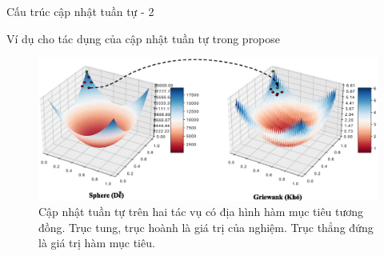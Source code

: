 \begin{frame}{Cấu trúc cập nhật tuần tự - 2}
    \begin{block}{Ví dụ cho tác dụng của cập nhật tuần tự trong \gls{propose}}
        \begin{figure}
            \centering
            \includegraphics[width=\linewidth]{figure/propose/sequential-motivation.eps}
            \caption{Cập nhật tuần tự trên hai tác vụ có địa hình hàm mục tiêu tương đồng. Trục tung, trục hoành là giá trị của nghiệm. Trục thẳng đứng là giá trị hàm mục tiêu.}
            \label{fig:propsoe:sequential-motivation}
        \end{figure}
    \end{block}
\end{frame}

